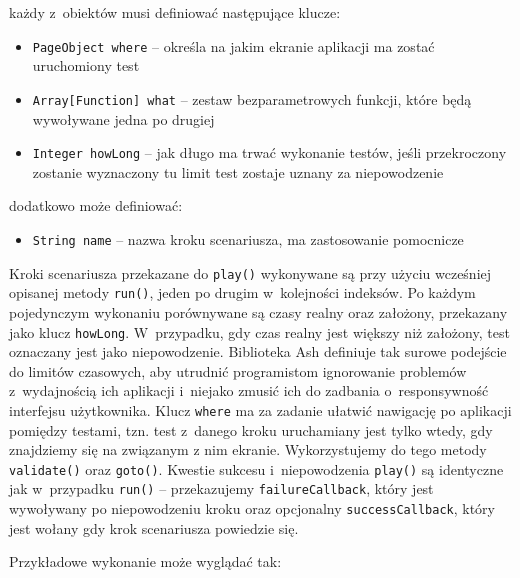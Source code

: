 \documentclass{xmgr}
\begin{document}
\noindent każdy z~obiektów musi definiować następujące klucze:

\begin{itemize}
  \item \texttt{PageObject where} -- określa na jakim ekranie aplikacji ma zostać uruchomiony test
  \item \texttt{Array[Function] what} -- zestaw bezparametrowych funkcji, które będą wywoływane jedna po drugiej 
  \item \texttt{Integer howLong} -- jak długo ma trwać wykonanie testów, jeśli przekroczony zostanie wyznaczony tu limit test zostaje uznany za niepowodzenie 
\end{itemize}

\noindent dodatkowo może definiować:

\begin{itemize} 
  \item \texttt{String name} -- nazwa kroku scenariusza, ma zastosowanie pomocnicze
\end{itemize}

Kroki scenariusza przekazane do \texttt{play()} wykonywane są przy użyciu wcześniej opisanej metody \texttt{run()}, jeden po drugim w~kolejności indeksów. Po każdym pojedynczym wykonaniu porównywane są czasy realny oraz założony, przekazany jako klucz \texttt{howLong}. W~przypadku, gdy czas realny jest większy niż założony, test oznaczany jest jako niepowodzenie. Biblioteka Ash definiuje tak surowe podejście do limitów czasowych, aby utrudnić programistom ignorowanie problemów z~wydajnością ich aplikacji i~niejako zmusić ich do zadbania o~responsywność interfejsu użytkownika. Klucz \texttt{where} ma za zadanie ułatwić nawigację po aplikacji pomiędzy testami, tzn. test z~danego kroku uruchamiany jest tylko wtedy, gdy znajdziemy się na związanym z nim  ekranie. Wykorzystujemy do tego metody \texttt{validate()} oraz \texttt{goto()}. Kwestie sukcesu i~niepowodzenia \texttt{play()} są identyczne jak w~przypadku \texttt{run()} -- przekazujemy \texttt{failureCallback}, który jest wywoływany po niepowodzeniu kroku oraz opcjonalny \texttt{successCallback},  który jest wołany gdy krok scenariusza powiedzie się. 

\medskip \noindent Przykładowe wykonanie może wyglądać tak:
\end{document}
